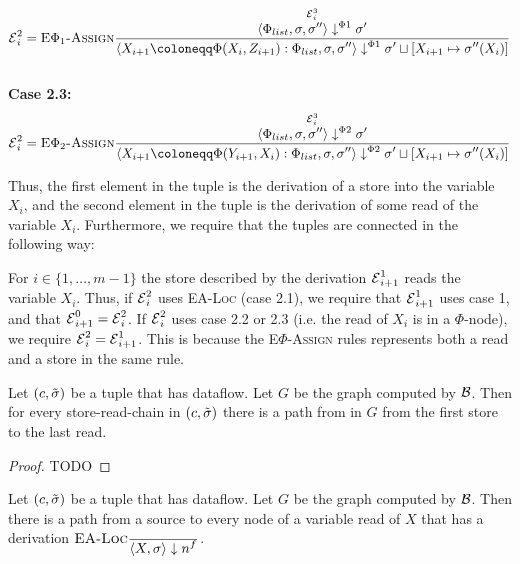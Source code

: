\begin{definition}
    \begin{align*}
        \E^2_i=\bsrule{E$\Phi_1$-Assign}
        {\overset{\E^3_i}{\bigsteppl{\defaultphilist}{\store}{\store''}{\store'}}}
        {\bigsteppl{\phistore{X_{i+1}}{X_i}{Z_{i+1}} : \defaultphilist}{\store}{\store''}{\storeassign{\store'}{X_{i+1} \mapsto \store''(X_i)}}}\\
    \end{align*}\\
    \textbf{Case 2.3:}\\
    \begin{align*}
        \E^2_i=\bsrule{E$\Phi_2$-Assign}
        {\overset{\E^3_i}{\bigsteppr{\defaultphilist}{\store}{\store''}{\store'}}}
        {\bigsteppr{\phistore{X_{i+1}}{Y_{i+1}}{X_i} : \defaultphilist}{\store}{\store''}{\storeassign{\store'}{X_{i+1} \mapsto \store''(X_i)}}}\\
    \end{align*}

    Thus, the first element in the tuple is the derivation of a store into the variable
    $X_i$, and the second element in the tuple is the derivation of some read of the 
    variable $X_i$.
    Furthermore, we require that the tuples are connected in the following way:
    
    For $i \in \{1, \ldots, m-1\}$ the store described by the derivation
    $\operatorname{\mathcal{E}}^1_{i+1}$ reads the variable $X_i$.
    Thus, if $\operatorname{\mathcal{E}}^2_i$ uses \textsc{EA-Loc} (case 2.1), we require that $\operatorname{\mathcal{E}}^1_{i+1}$ uses case 1,
    and that $\operatorname{\mathcal{E}}^0_{i+1} = \operatorname{\mathcal{E}}^2_i$.
    If $\operatorname{\mathcal{E}}^2_i$ uses case 2.2 or 2.3 (i.e. the read of $X_i$ is in a $\Phi$-node), we require
    $\operatorname{\mathcal{E}}^2_i = \operatorname{\mathcal{E}}^1_{i+1}$.
    This is because the \textsc{E$\Phi$-Assign} rules represents both a read and a store
    in the same rule.
\end{definition}

\begin{lemma}
    Let $(c, \tilde{\sigma}{})$ be a tuple that has dataflow.
    Let $G$ be the graph computed by $\operatorname{\mathcal{B}}$.
    Then for every store-read-chain in $(c, \tilde{\sigma}{})$ 
    there is a path from in $G$ from the first store to the last read.
\end{lemma}
\begin{proof}
    TODO
\end{proof}


\begin{lemma}
    Let $(c, \tilde{\sigma}{})$ be a tuple that has dataflow.
    Let $G$ be the graph computed by $\operatorname{\mathcal{B}}$.
    Then there is a path
    from a source to every node of a variable read of $X$ that has a
    derivation $\textsc{EA-Loc}\frac{\displaystyle }{\displaystyle \langle X, \sigma \rangle \downarrow n^f{}}$.
    
\end{lemma}

